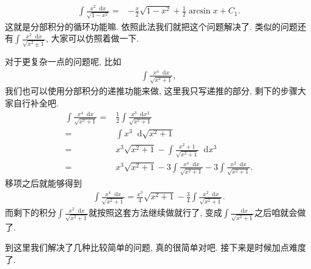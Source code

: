 \documentclass{ctexbook}
\newcommand*{\dif}{\mathop{}\!\mathrm{d}}
\begin{document}
{\begin{align*}
\int\frac{x^{2}\dif{x}}{\sqrt{1-x^{2}}}={}&-\frac{x}{2}\sqrt{1-x^{2}}+\frac{1}{2}\arcsin{x}+C_{1}
.\end{align*}
这就是分部积分的循环功能嘛. 依照此法我们就把这个问题解决了. 类似的问题还有$\int\frac{x^{2}\dif{x}}{\sqrt{x^{2}\pm1}}$, 大家可以仿照着做一下. \par
对于更复杂一点的问题呢, 比如
\begin{align*}
\int\frac{x^{4}\dif{x}}{\sqrt{x^{2}+1}}
,\end{align*}
我们也可以使用分部积分的递推功能来做, 这里我只写递推的部分, 剩下的步骤大家自行补全吧. 
\begin{align*}
\int\frac{x^{4}\dif{x}}{\sqrt{x^{2}+1}}={}&\frac{1}{2}\int\frac{x^{3}\dif{x^{2}}}{\sqrt{x^{2}+1}}\\
={}&\int x^{3}\dif{\sqrt{x^{2}+1}}\\
={}&x^{3}\sqrt{x^{2}+1}-\int\frac{x^{2}+1}{\sqrt{x^{2}+1}}\dif{x^{3}}\\
={}&x^{3}\sqrt{x^{2}+1}-3\int\frac{x^{4}\dif{x}}{\sqrt{x^{2}+1}}-3\int\frac{x^{2}\dif{x}}{\sqrt{x^{2}+1}}
.\end{align*}
移项之后就能够得到
\begin{align*}
\int\frac{x^{4}\dif{x}}{\sqrt{x^{2}+1}}=\frac{x^{3}}{4}\sqrt{x^{2}+1}-\frac{3}{4}\int\frac{x^{2}\dif{x}}{\sqrt{x^{2}+1}}
.\end{align*}
而剩下的积分$\int\frac{x^{2}\dif{x}}{\sqrt{x^{2}+1}}$就按照这套方法继续做就行了, 变成$\int\frac{\dif{x}}{\sqrt{x^{2}+1}}$之后咱就会做了. \par
到这里我们解决了几种比较简单的问题, 真的很简单对吧. 接下来是时候加点难度了. \par
}
\end{document}
